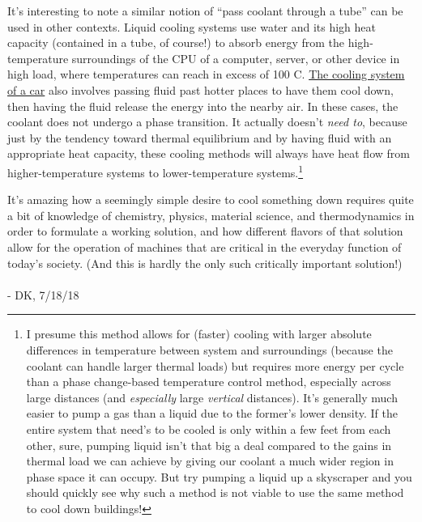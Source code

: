 \documentclass[../main/main.tex]{subfiles}
\begin{document}
It's interesting to note a similar notion of
``pass coolant through a tube''
can be used in other contexts.
Liquid cooling systems use water and its high heat capacity
(contained in a tube, of course!)
to absorb energy from the high-temperature surroundings of the
CPU of a computer, server, or other device in high load, where
temperatures can reach in excess of 100 \textdegree C.
\href{https://auto.howstuffworks.com/cooling-system.htm/printable}
{The cooling system of a car} also involves passing
fluid past hotter places to have them cool down, then having
the fluid release the energy into the nearby air.
In these cases, the coolant does not undergo a phase transition.
It actually doesn't \emph{need to}, because just by
the tendency toward thermal equilibrium and by 
having fluid with an appropriate heat capacity,
these cooling methods
will always have heat flow from higher-temperature systems
to lower-temperature systems.\footnote
{
    I presume this method
allows for (faster) cooling with larger absolute differences
in temperature between system and surroundings 
(because the coolant can handle larger thermal loads) but
requires more energy per cycle than a phase change-based
temperature control method, especially across large 
distances
(and \emph{especially} large \emph{vertical} distances).
It's generally much easier to pump a gas than a liquid due
to the former's lower density. If the entire system
that need's to be cooled is only within a few feet
from each other, sure, pumping liquid isn't that big a deal
compared to the gains in thermal load we can achieve
by giving our coolant a much wider region in phase space
it can occupy.
But try pumping a liquid up a skyscraper and you should
quickly see why such a method is not viable to use the
same method to cool down buildings!
}\par

It's amazing how a seemingly simple desire to cool something
down requires quite a bit of knowledge of chemistry, physics,
material science, and thermodynamics in order to formulate
a working solution, and how different flavors of that solution
allow for the operation of machines that are critical in
the everyday function of today's society.
(And this is hardly the only such critically
important solution!)
\\
\\
- DK, 7/18/18
\end{document}
